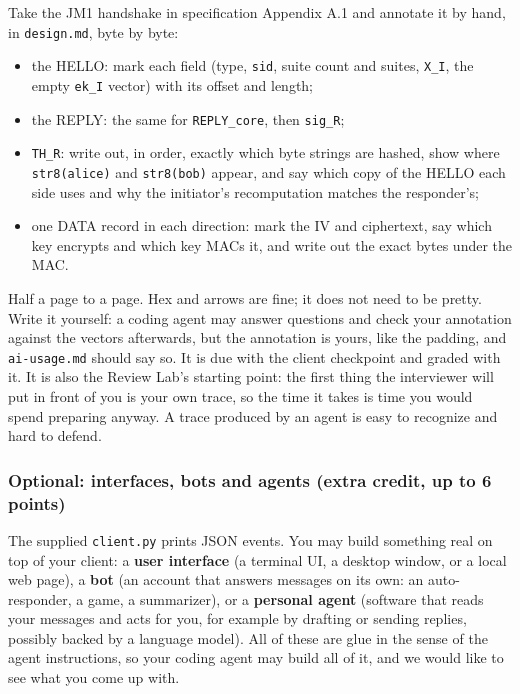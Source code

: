 \documentclass[11pt]{article}
\begin{document}
Take the JM1 handshake in specification Appendix A.1 and annotate it by hand, in \texttt{design.md}, byte by byte:

\begin{itemize}
\item the HELLO: mark each field (type, \texttt{sid}, suite count and suites, \texttt{X\_I}, the empty \texttt{ek\_I} vector) with its offset and length;
\item the REPLY: the same for \texttt{REPLY\_core}, then \texttt{sig\_R};
\item \texttt{TH\_R}: write out, in order, exactly which byte strings are hashed, show where \texttt{str8(alice)} and \texttt{str8(bob)} appear, and say which copy of the HELLO each side uses and why the initiator's recomputation matches the responder's;
\item one DATA record in each direction: mark the IV and ciphertext, say which key encrypts and which key MACs it, and write out the exact bytes under the MAC.
\end{itemize}
Half a page to a page. Hex and arrows are fine; it does not need to be pretty. Write it yourself: a coding agent may answer questions and check your annotation against the vectors afterwards, but the annotation is yours, like the padding, and \texttt{ai-{}usage.md} should say so. It is due with the client checkpoint and graded with it. It is also the Review Lab's starting point: the first thing the interviewer will put in front of you is your own trace, so the time it takes is time you would spend preparing anyway. A trace produced by an agent is easy to recognize and hard to defend.

\subsubsection*{Optional: interfaces, bots and agents (extra credit, up to 6 points)}

The supplied \texttt{client.py} prints JSON events. You may build something real on top of your client: a \textbf{user interface} (a terminal UI, a desktop window, or a local web page), a \textbf{bot} (an account that answers messages on its own: an auto-responder, a game, a summarizer), or a \textbf{personal agent} (software that reads your messages and acts for you, for example by drafting or sending replies, possibly backed by a language model). All of these are glue in the sense of the agent instructions, so your coding agent may build all of it, and we would like to see what you come up with.
\end{document}

